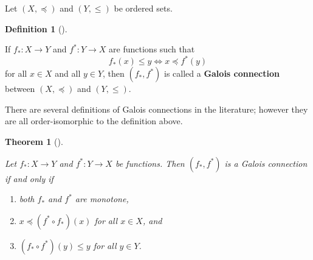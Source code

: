 \documentclass[
  letterpaper,
  10pt,
  reqno,
  twopage,
  openany]{book}
\providecommand{\tightlist}{%
  \setlength{\itemsep}{0pt}\setlength{\parskip}{0pt}}\usepackage{longtable,booktabs,array}
\theoremstyle{plain}
\theoremstyle{definition}
\theoremstyle{definition}
\newtheorem{definition}{Definition}[chapter]
\theoremstyle{definition}
\theoremstyle{plain}
\theoremstyle{plain}
\newtheorem{theorem}{Theorem}[chapter]
\theoremstyle{remark}
\begin{document}
Let \((X,\preceq)\) and \((Y,\leqslant)\) be ordered sets.

\leavevmode{}%
\begin{definition}[]\label{def-galois-connection}

If \(f_*:X\to Y\) and \(f^*:Y\to X\) are functions such that
\begin{equation}
\label{gc}
f_*(x)\leqslant y  \Longleftrightarrow x\preceq f^*(y)
\end{equation} for all \(x\in X\) and all \(y\in Y\), then
\((f_*, f^*)\) is called a  \textbf{Galois
connection} between \((X,\preceq)\) and \((Y,\leqslant)\).

\end{definition}

There are several definitions of Galois connections in the literature;
however they are all order-isomorphic to the definition above.

\leavevmode{}%
\begin{theorem}[]\label{thm-gcch}

Let \(f_*:X\to Y\) and \(f^*:Y\to X\) be functions. Then \((f_*, f^*)\)
is a Galois connection if and only if

\begin{enumerate}
\def\labelenumi{\arabic{enumi}.}
\tightlist
\item
  both \(f_*\) and \(f^*\) are monotone,
\item
  \(x\preceq (f^*\circ f_*)(x)\) for all \(x\in X\), and
\item
  \((f_* \circ f^*)(y)\leqslant y\) for all \(y\in Y\).
\end{enumerate}

\end{theorem}
\end{document}
